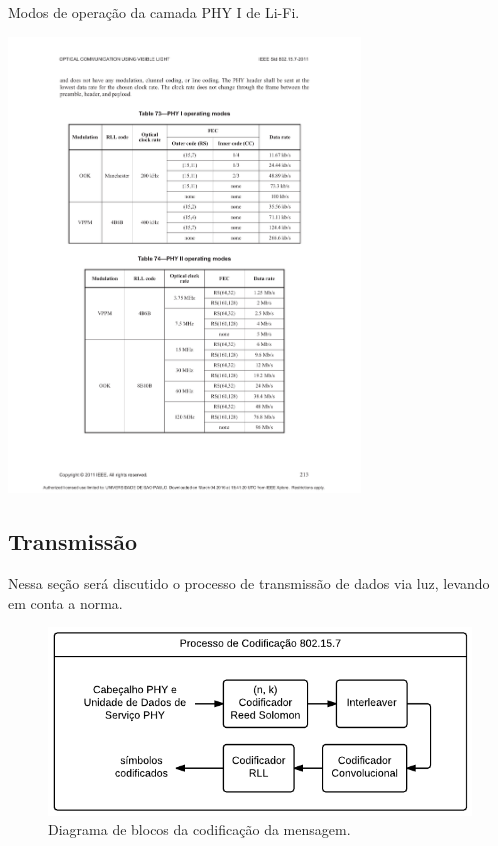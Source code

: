 	\begin{table}[h!]
		\caption{\label{tab_phy1}Modos de operação da camada PHY I de Li-Fi.}
		\centering
		\includegraphics[clip, trim=37mm 151mm 36mm 51mm,  width=0.7\textwidth]{pag213.pdf}
	\end{table}

	\subsection{Transmissão}

	Nessa seção será discutido o processo de transmissão de dados via luz, levando em conta a norma.

		\begin{figure}[htb]
			\caption{\label{fig_transmission_phy1}Diagrama de blocos da codificação da mensagem.}
			\centering
			\includegraphics[width=0.4\textheight]{PHY1-transmission.pdf}
		\end{figure}

